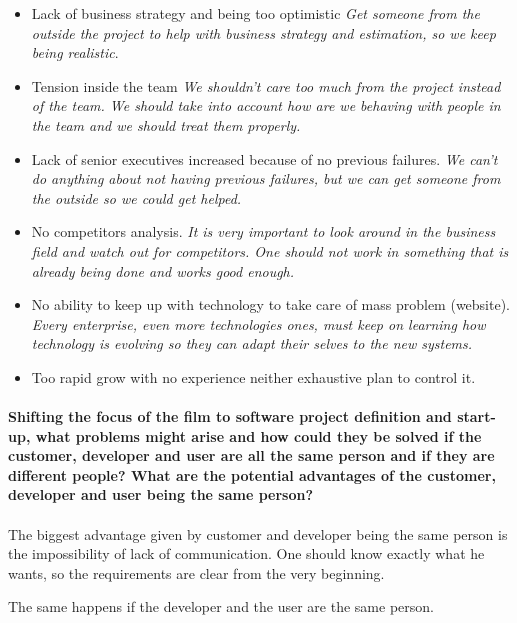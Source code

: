 \documentclass{article}
\begin{document}
\begin{itemize}
	\item Lack of business strategy and being too optimistic \textit{Get someone from the outside the project to help with business strategy and estimation, so we keep being realistic}.
	\item Tension inside the team \textit{We shouldn't care too much from the project instead of the team. We should take into account how are we behaving with people in the team and we should treat them properly.}
	\item Lack of senior executives increased because of no previous failures. \textit{We can't do anything about not having previous failures, but we can get someone from the outside so we could get helped.}
	\item No competitors analysis. \textit{It is very important to look around in the business field and watch out for competitors. One should not work in something that is already being done and works good enough.}
	\item No ability to keep up with technology to take care of mass problem (website). \textit{Every enterprise, even more technologies ones, must keep on learning how technology is evolving so they can adapt their selves to the new systems.}
	\item Too rapid grow with no experience neither exhaustive plan to control it.
\end{itemize}

\paragraph{Shifting the focus of the film to software project definition and start-up, what problems might arise and how could they be solved if the customer, developer and user are all the same person and if they are different people? What are the potential advantages of the customer, developer and user being the same person?}
\paragraph{}


The biggest advantage given by  customer and developer being the same person is the impossibility of lack of communication. One should know exactly what he wants, so the requirements are clear from the very beginning.

The same happens if the developer and the user are the same person. 
\end{document}
